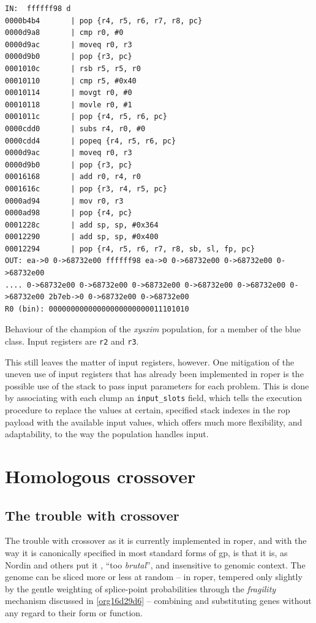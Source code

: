 \documentclass[12pt,glossary]{dalthesis}
\begin{document}
\begin{table}
\begin{lstlisting}
IN:  ffffff98 d
0000b4b4       | pop {r4, r5, r6, r7, r8, pc}
0000d9a8       | cmp r0, #0
0000d9ac       | moveq r0, r3
0000d9b0       | pop {r3, pc}
0001010c       | rsb r5, r5, r0
00010110       | cmp r5, #0x40
00010114       | movgt r0, #0
00010118       | movle r0, #1
0001011c       | pop {r4, r5, r6, pc}
0000cdd0       | subs r4, r0, #0
0000cdd4       | popeq {r4, r5, r6, pc}
0000d9ac       | moveq r0, r3
0000d9b0       | pop {r3, pc}
00016168       | add r0, r4, r0
0001616c       | pop {r3, r4, r5, pc}
0000ad94       | mov r0, r3
0000ad98       | pop {r4, pc}
0001228c       | add sp, sp, #0x364
00012290       | add sp, sp, #0x400
00012294       | pop {r4, r5, r6, r7, r8, sb, sl, fp, pc}
OUT: ea->0 0->68732e00 ffffff98 ea->0 0->68732e00 0->68732e00 0->68732e00 
.... 0->68732e00 0->68732e00 0->68732e00 0->68732e00 0->68732e00 0->68732e00 2b7eb->0 0->68732e00 0->68732e00 
R0 (bin): 00000000000000000000000011101010
\end{lstlisting}
\caption{Behaviour of the champion of the \emph{xysxim} population, for a member of the blue class. Input registers are \texttt{r2} and \texttt{r3}.}
\label{tab:xysxim-champ-blue}
\end{table}

This still leaves the matter of input registers, however. One mitigation of the uneven use of
input registers that has already been implemented in \gls{roper} is the possible use of the
stack to pass input parameters for each problem. This is done by associating with each
clump an \texttt{input\_slots} field, which tells the execution procedure to replace the values at
certain, specified stack indexes in the \gls{rop} payload with the available input values, which
offers much more flexibility, and adaptability, to the way the population handles input. 
\section{Homologous crossover}
\label{sec:orgd8a2bab}
\subsection{The trouble with crossover}
\label{sec:orgfaf851d}
The trouble with crossover as it is currently implemented in \gls{roper}, and with
the way it is canonically specified in most standard forms of \gls{gp},
is that it is, as Nordin and others put it \cite{nordin99}, ``too \emph{brutal}'', and
insensitive to genomic context. The genome can be sliced more or less at random --
in \gls{roper}, tempered only slightly by the gentle weighting of splice-point probabilities
through the \emph{fragility} mechanism discussed in \ref{org16d29d6} -- combining and substituting
genes without any regard to their form or function.
\end{document}
